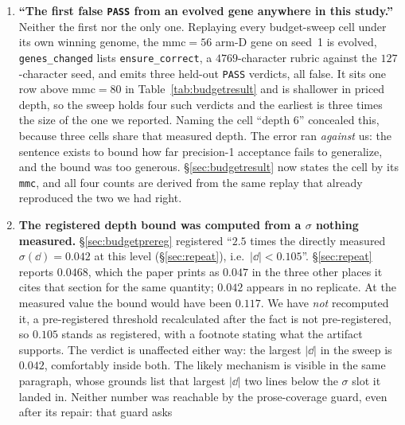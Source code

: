 \documentclass[11pt]{article}
\begin{document}
\begin{enumerate}
    Appendix~\ref{sec:handgene}'s decomposition \emph{names}: three where the verdict changed and five
    where the draft needed no change. Nothing quantitative moves; the $-0.009$/$-0.023$ split and
    every number in it stand. \texttt{verify\_paper\_claims.py} now derives all three stratum
    sizes from the replay, so the sentence cannot be restated the old way.
  \item \textbf{``The first false \texttt{PASS} from an evolved gene anywhere in this study.''}
    Neither the first nor the only one. Replaying every budget-sweep cell under its own winning
    genome, the $\mathrm{mmc}{=}56$ arm-D gene on seed~1 is evolved, \texttt{genes\_changed}
    lists \texttt{ensure\_correct}, a $4769$-character rubric against the $127$-character seed,
    and emits three held-out \texttt{PASS} verdicts, all false. It sits one row above
    $\mathrm{mmc}{=}80$ in Table~\ref{tab:budgetresult} and is shallower in priced depth, so the
    sweep holds four such verdicts and the earliest is three times the size of the one we reported.
    Naming the cell ``depth $6$'' concealed this, because three cells share that measured depth.
    The error ran \emph{against} us: the sentence exists to bound how far precision-1 acceptance
    fails to generalize, and the bound was too generous. \S\ref{sec:budgetresult} now states the
    cell by its \texttt{mmc}, and all four counts are derived from the same replay that already
    reproduced the two we had right.
  \item \textbf{The registered depth bound was computed from a $\sigma$ nothing measured.}
    \S\ref{sec:budgetprereg} registered ``$2.5$ times the directly measured $\sigma(\dd) = 0.042$ at
    this level (\S\ref{sec:repeat}), i.e.\ $|\dd| < 0.105$''. \S\ref{sec:repeat} reports $0.0468$,
    which the paper prints as $0.047$ in the three other places it cites that section for the same
    quantity; $0.042$ appears in no replicate. At the measured value the bound would have been
    $0.117$. We have \emph{not} recomputed it, a pre-registered threshold recalculated after the
    fact is not pre-registered, so $0.105$ stands as registered, with a footnote stating what the
    artifact supports. The verdict is unaffected either way: the largest $|\dd|$ in the sweep is
    $0.042$, comfortably inside both. The likely mechanism is visible in the same paragraph, whose
    grounds list that largest $|\dd|$ two lines below the $\sigma$ slot it landed in.
    Neither number was reachable by the prose-coverage guard, even after its repair: that guard asks

\end{enumerate}
\end{document}
